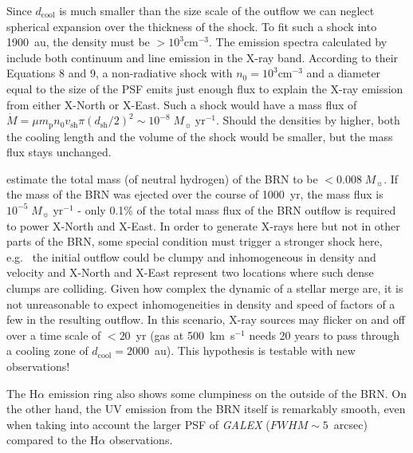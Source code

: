 \documentclass[linenumbers]{aastex631}
\begin{document}
Since $d_{\mathrm{cool}}$ is much smaller than the size scale of the outflow we can neglect spherical expansion over the thickness of the shock.
To fit such a shock into 1900~au, the density must be $>10^3\mathrm{ cm}^{-3}$. The emission spectra calculated by \citet{2002ApJ...576L.149R} include both continuum and line emission in the X-ray band. According to their Equations 8 and 9, a non-radiative shock with $n_0=10^3\mathrm{ cm}^{-3}$ and a diameter equal to the size of the PSF emits just enough flux to explain the X-ray emission from either X-North or X-East. Such a shock would have a mass flux of $\dot M = \mu m_\mathrm{p} n_0 v_\mathrm{sh} \pi (d_\mathrm{sh}/2)^2 \sim 10^{-8}\;M_\sun\;\mathrm{yr}^{-1}$.
Should the densities by higher, both the cooling length and the volume of the shock would be smaller, but the mass flux stays unchanged.

\citet{2020Natur.587..387H} estimate the total mass (of neutral hydrogen) of the BRN to be $<0.008\;M_\sun{}$. If the mass of the BRN was ejected over the course of 1000~yr, the mass flux is $10^{-5}\;M_\sun\;\mathrm{yr}^{-1}$ - only 0.1\% of the total mass flux of the BRN outflow is required to power X-North and X-East. In order to generate X-rays here but not in other parts of the BRN, some special condition must trigger a stronger shock here, e.g.\
the initial outflow could be clumpy and inhomogeneous in density and velocity and X-North and X-East represent two locations where such dense clumps are colliding. Given how complex the dynamic of a stellar merge are, it is not unreasonable to expect inhomogeneities in density and speed of factors of a few in the resulting outflow. In this scenario, X-ray sources may flicker on and off over a time scale of $<20$~yr (gas at 500~km~s$^{-1}$ needs 20 years to pass through a cooling zone of $d_{\mathrm{cool}}=2000$~au). This hypothesis is testable with new observations!

The H$\alpha$ emission ring also shows some clumpiness on the outside of the BRN. On the other hand, the UV emission from the BRN itself is remarkably smooth, even when taking into account the larger PSF of \emph{GALEX} ($FWHM \sim 5$~arcsec) compared to the H$\alpha$ observations.
\end{document}
